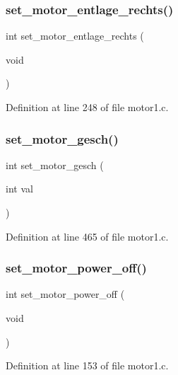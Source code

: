 \subsubsection{set\+\_\+motor\+\_\+entlage\+\_\+rechts()}
{\footnotesize\ttfamily int set\+\_\+motor\+\_\+entlage\+\_\+rechts (\begin{DoxyParamCaption}\item[{void}]{ }\end{DoxyParamCaption})}



Definition at line 248 of file motor1.\+c.

\mbox{\label{motor1_8c_a3e09d5cea7b692aceb221749999cb52b}} 
\subsubsection{set\+\_\+motor\+\_\+gesch()}
{\footnotesize\ttfamily int set\+\_\+motor\+\_\+gesch (\begin{DoxyParamCaption}\item[{int}]{val }\end{DoxyParamCaption})}



Definition at line 465 of file motor1.\+c.

\mbox{\label{motor1_8c_aca930076cffa70b62efe0f7f4281f80d}} 
\subsubsection{set\+\_\+motor\+\_\+power\+\_\+off()}
{\footnotesize\ttfamily int set\+\_\+motor\+\_\+power\+\_\+off (\begin{DoxyParamCaption}\item[{void}]{ }\end{DoxyParamCaption})}



Definition at line 153 of file motor1.\+c.

\mbox{\label{motor1_8c_a880850784362150376faf21b3ce817ca}} 
